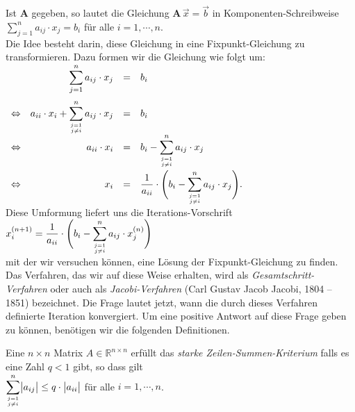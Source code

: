 Ist $\mathbf{A}$ gegeben, so lautet die Gleichung $\mathbf{A}\,\vec{x} = \vec{b}$ in Komponenten-Schreibweise 
\\[0.2cm]
\hspace*{1.3cm}
$\displaystyle \sum\limits_{j=1}^n a_{ij} \cdot  x_j = b_i$ \quad f\"ur alle $i = 1,\cdots,n$.
\\[0.2cm]
Die Idee besteht darin, diese Gleichung in eine Fixpunkt-Gleichung zu transformieren.
Dazu formen wir die Gleichung wie folgt um: 
\\[0.3cm]
\hspace*{1.3cm}
$
\begin{array}{crcl}
                &  \displaystyle \sum\limits_{j=1}^n a_{ij} \cdot  x_j & = & b_i \\[0.6cm]
\Leftrightarrow & \displaystyle a_{ii} \cdot  x_i + \sum\limits_{j=1 \atop j \not= i}^n a_{ij} \cdot  x_j & = & b_i \\[0.2cm]
\Leftrightarrow & a_{ii} \cdot  x_i & = & \displaystyle b_i - \sum\limits_{j=1 \atop j \not= i}^n a_{ij} \cdot  x_j \\[0.6cm]
\Leftrightarrow & x_i & = & \displaystyle \frac{1}{a_{ii}} \cdot  \Biggl( b_i - \sum\limits_{j=1 \atop j \not= i}^n a_{ij} \cdot  x_j \Biggr). \\[0.3cm]
\end{array}
$
\\[0.2cm]
Diese Umformung liefert uns die Iterations-Vorschrift
\\[0.2cm]
\hspace*{1.3cm}
$x^{(n+1)}_i = \displaystyle \frac{1}{a_{ii}} \cdot  \Biggl( b_i - \sum\limits_{j=1 \atop j \not= i}^n a_{ij} \cdot  x^{(n)}_j \Biggr)$
\\[0.2cm]
mit der wir versuchen k\"onnen, eine L\"osung der Fixpunkt-Gleichung zu finden.
Das Verfahren, das wir auf diese Weise erhalten, wird als \emph{Gesamtschritt-Verfahren}
oder auch als \emph{Jacobi-Verfahren} (Carl Gustav Jacob Jacobi, 1804 -- 1851) bezeichnet.
Die Frage lautet jetzt, wann die durch dieses Verfahren definierte Iteration konvergiert.
Um eine positive Antwort auf diese Frage geben zu k\"onnen, ben\"otigen wir die folgenden Definitionen.

\begin{Definition}
  Eine $n\times n$ Matrix $A \in \mathbb{R}^{n\times n}$ erf\"ullt das \emph{starke Zeilen-Summen-Kriterium} 
 falls es eine Zahl $q < 1$ gibt, so dass gilt
  \\[0.2cm]
  \hspace*{1.3cm}
  $\displaystyle\sum\limits_{j=1 \atop j \not= i}^n \bigl| a_{ij} \bigr| \leq q \cdot
  \bigl| a_{ii} \bigr|$ \quad f\"ur alle $i = 1,\cdots,n$.
\end{Definition}

